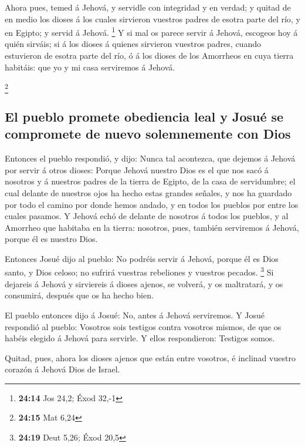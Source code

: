  Ahora pues, temed á Jehová, y servidle con integridad y en
verdad; y quitad de en medio los dioses á los cuales sirvieron vuestros
padres de esotra parte del río, y en Egipto; y servid á Jehová.
\footnote{\textbf{24:14} Jos 24,2; Éxod 32,-1}  Y si mal os
parece servir á Jehová, escogeos hoy á quién sirváis; si á los dioses á
quienes sirvieron vuestros padres, cuando estuvieron de esotra parte del
río, ó á los dioses de los Amorrheos en cuya tierra habitáis: que yo y
mi casa serviremos á Jehová.

\footnote{\textbf{24:15} Mat 6,24}

\hypertarget{el-pueblo-promete-obediencia-leal-y-josuuxe9-se-compromete-de-nuevo-solemnemente-con-dios}{%
\subsection{El pueblo promete obediencia leal y Josué se compromete de
nuevo solemnemente con
Dios}\label{el-pueblo-promete-obediencia-leal-y-josuuxe9-se-compromete-de-nuevo-solemnemente-con-dios}}

 Entonces el pueblo respondió, y dijo: Nunca tal acontezca,
que dejemos á Jehová por servir á otros dioses:  Porque
Jehová nuestro Dios es el que nos sacó á nosotros y á nuestros padres de
la tierra de Egipto, de la casa de servidumbre; el cual delante de
nuestros ojos ha hecho estas grandes señales, y nos ha guardado por todo
el camino por donde hemos andado, y en todos los pueblos por entre los
cuales pasamos.  Y Jehová echó de delante de nosotros á
todos los pueblos, y al Amorrheo que habitaba en la tierra: nosotros,
pues, también serviremos á Jehová, porque él es nuestro Dios.

 Entonces Josué dijo al pueblo: No podréis servir á Jehová,
porque él es Dios santo, y Dios celoso; no sufrirá vuestras rebeliones y
vuestros pecados. \footnote{\textbf{24:19} Deut 5,26; Éxod 20,5}
 Si dejareis á Jehová y sirviereis á dioses ajenos, se
volverá, y os maltratará, y os consumirá, después que os ha hecho bien.

 El pueblo entonces dijo á Josué: No, antes á Jehová
serviremos.  Y Josué respondió al pueblo: Vosotros sois
testigos contra vosotros mismos, de que os habéis elegido á Jehová para
servirle. Y ellos respondieron: Testigos somos.

 Quitad, pues, ahora los dioses ajenos que están entre
vosotros, é inclinad vuestro corazón á Jehová Dios de Israel.

